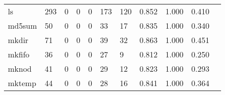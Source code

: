 \begin{longtable}{lp{1.2cm}p{1.2cm}p{1.2cm}p{1.2cm}p{1.2cm}p{1.2cm}p{1.2cm}p{1.2cm}p{1.2cm}p{1.2cm}}
ls        &                                   293 &                                                  0 &                                                  0 &                                                  0 &                                                173 &                                                120 &                                              0.852 &                                              1.000 &                                              0.410 \\
md5sum    &                                    50 &                                                  0 &                                                  0 &                                                  0 &                                                 33 &                                                 17 &                                              0.835 &                                              1.000 &                                              0.340 \\
mkdir     &                                    71 &                                                  0 &                                                  0 &                                                  0 &                                                 39 &                                                 32 &                                              0.863 &                                              1.000 &                                              0.451 \\
mkfifo    &                                    36 &                                                  0 &                                                  0 &                                                  0 &                                                 27 &                                                  9 &                                              0.812 &                                              1.000 &                                              0.250 \\
mknod     &                                    41 &                                                  0 &                                                  0 &                                                  0 &                                                 29 &                                                 12 &                                              0.823 &                                              1.000 &                                              0.293 \\
mktemp    &                                    44 &                                                  0 &                                                  0 &                                                  0 &                                                 28 &                                                 16 &                                              0.841 &                                              1.000 &                                              0.364 \\

\end{longtable}
